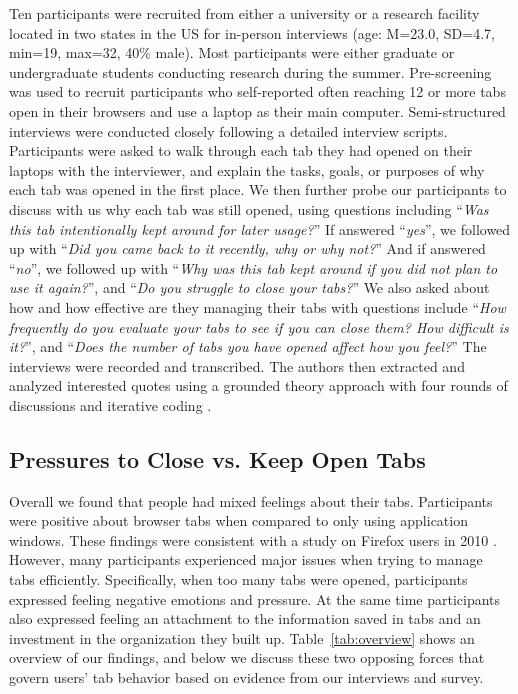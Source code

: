 Ten participants were recruited from either a university or a research facility located in two states in the US for in-person interviews (age: M=23.0, SD=4.7, min=19, max=32, 40\% male). Most participants were either graduate or undergraduate students conducting research during the summer. Pre-screening was used to recruit participants who self-reported often reaching 12 or more tabs open in their browsers and use a laptop as their main computer. 
Semi-structured interviews were conducted closely following a detailed interview scripts. Participants were asked to walk through each tab they had opened on their laptops with the interviewer, and explain the tasks, goals, or purposes of why each tab was opened in the first place. We then further probe our participants to discuss with us why each tab was still opened, using questions including ``\emph{Was this tab intentionally kept around for later usage?}'' If answered ``\emph{yes}'', we followed up with ``\emph{Did you came back to it recently, why or why not?}'' And if answered ``\emph{no}'', we followed up with ``\emph{Why was this tab kept around if you did not plan to use it again?}'', and ``\emph{Do you struggle to close your tabs?}''  We also asked about how and how effective are they managing their tabs with questions include ``\emph{How frequently do you evaluate your tabs to see if you can close them? How difficult is it?}'', and ``\emph{Does the number of tabs you have opened affect how you feel?}'' The interviews were recorded and transcribed. The authors then extracted and analyzed interested quotes using a grounded theory approach with four rounds of discussions and iterative coding \cite{strauss1998basics}.


\subsection{Pressures to Close vs. Keep Open Tabs}

Overall we found that people had mixed feelings about their tabs. Participants were positive about browser tabs when compared to only using application windows. These findings were consistent with a study on Firefox users in 2010 \cite{Dubroy:2010:STB:1753326.1753426}. 
However, many participants experienced major issues when trying to manage tabs efficiently. Specifically, when too many tabs were opened, participants expressed feeling negative emotions and pressure. At the same time participants also expressed feeling an attachment to the information saved in tabs and an investment in the organization they built up. Table~\ref{tab:overview} shows an overview of our findings, and below we discuss these two opposing forces that govern users' tab behavior based on evidence from our interviews and survey.


